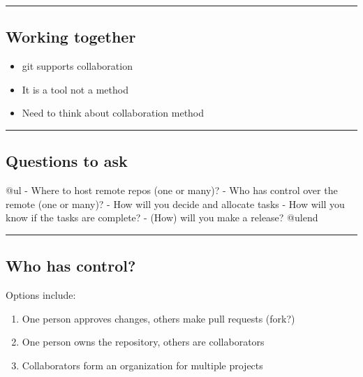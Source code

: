 \begin{center}\rule{0.5\linewidth}{\linethickness}\end{center}

\hypertarget{working-together}{%
\subsection{Working together}\label{working-together}}

\begin{itemize}
\tightlist
\item
  git supports collaboration
\item
  It is a tool not a method
\item
  Need to think about collaboration method
\end{itemize}

\begin{center}\rule{0.5\linewidth}{\linethickness}\end{center}

\hypertarget{questions-to-ask}{%
\subsection{Questions to ask}\label{questions-to-ask}}

@ul - Where to host remote repos (one or many)? - Who has control over
the remote (one or many)? - How will you decide and allocate tasks - How
will you know if the tasks are complete? - (How) will you make a
release? @ulend

\begin{center}\rule{0.5\linewidth}{\linethickness}\end{center}

\hypertarget{who-has-control}{%
\subsection{Who has control?}\label{who-has-control}}

Options include:

\begin{enumerate}
\def\labelenumi{\arabic{enumi}.}
\tightlist
\item
  One person approves changes, others make pull requests (fork?)
\item
  One person owns the repository, others are collaborators
\item
  Collaborators form an organization for multiple projects
\end{enumerate}

